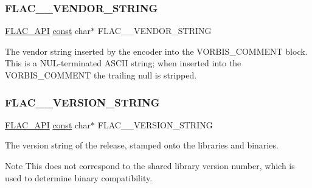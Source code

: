 \subsubsection{\texorpdfstring{F\+L\+A\+C\+\_\+\+\_\+\+V\+E\+N\+D\+O\+R\+\_\+\+S\+T\+R\+I\+NG}{FLAC\_\_VENDOR\_STRING}}
{\footnotesize\ttfamily \hyperlink{group__flac__export_ga56ca07df8a23310707732b1c0007d6f5}{F\+L\+A\+C\+\_\+\+A\+PI} \hyperlink{zconf_8h_a2c212835823e3c54a8ab6d95c652660e}{const} char$\ast$ F\+L\+A\+C\+\_\+\+\_\+\+V\+E\+N\+D\+O\+R\+\_\+\+S\+T\+R\+I\+NG}

The vendor string inserted by the encoder into the V\+O\+R\+B\+I\+S\+\_\+\+C\+O\+M\+M\+E\+NT block. This is a N\+U\+L-\/terminated A\+S\+C\+II string; when inserted into the V\+O\+R\+B\+I\+S\+\_\+\+C\+O\+M\+M\+E\+NT the trailing null is stripped. \mbox{\label{group__flac__format_ga1bd3aa4d4ce0393e51dd55bb3e48fbc1}} 
\subsubsection{\texorpdfstring{F\+L\+A\+C\+\_\+\+\_\+\+V\+E\+R\+S\+I\+O\+N\+\_\+\+S\+T\+R\+I\+NG}{FLAC\_\_VERSION\_STRING}}
{\footnotesize\ttfamily \hyperlink{group__flac__export_ga56ca07df8a23310707732b1c0007d6f5}{F\+L\+A\+C\+\_\+\+A\+PI} \hyperlink{zconf_8h_a2c212835823e3c54a8ab6d95c652660e}{const} char$\ast$ F\+L\+A\+C\+\_\+\+\_\+\+V\+E\+R\+S\+I\+O\+N\+\_\+\+S\+T\+R\+I\+NG}

The version string of the release, stamped onto the libraries and binaries.

\begin{DoxyNote}{Note}
This does not correspond to the shared library version number, which is used to determine binary compatibility. 
\end{DoxyNote}
